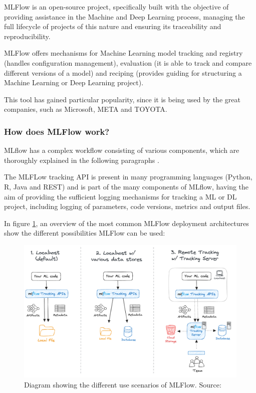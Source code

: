 MLFlow is an open-source project, specifically built with the objective of providing assistance in the Machine and Deep Learning process, managing the full lifecycle of 
projects of this nature and ensuring its traceability and reproducibility\cite{mlflowdocs}.

MLFlow offers mechanisms for Machine Learning model tracking and registry (handles configuration management), evaluation (it is able to track and compare different 
versions of a model) and reciping (provides guiding for structuring a Machine Learning or Deep Learning project).

This tool has gained particular popularity, since it is being used by the great companies, such as Microsoft, META and TOYOTA.

\subsubsection{How does MLFlow work?}

MLflow has a complex workflow consisting of various components, which are thoroughly explained in the following paragraphs \cite{mlflowtracking}.

The MLFLow tracking \acrfull{API} is present in many programming languages (Python, R, Java and REST) and is part of the many components of MLflow, having the aim of 
providing the sufficient logging mechanisms for tracking a \acrshort{ML} or \acrshort{DL} project, including logging of parameters, code versions, metrics and output files.

In figure \ref{fig:MLFlowScenarios}, an overview of the most common MLFlow deployment architectures show the different possibilities MLFlow can be used:

\begin{figure}[H]
    \centering
    \includegraphics[width=0.8\linewidth]{figs/mlflow-tracking.png}
    \caption{Diagram showing the different use scenarios of MLFlow. Source:\cite{mlflowtracking}}
    \label{fig:MLFlowScenarios}
\end{figure}

